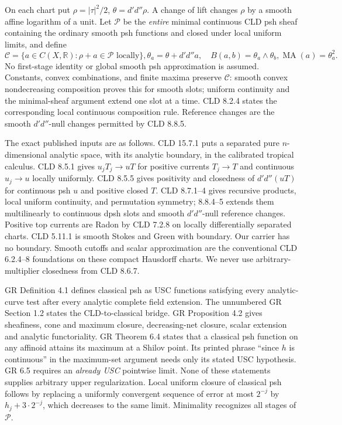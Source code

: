 \documentclass[11pt]{article}
\newcommand{\DD}{d'd''}
\newcommand{\MA}{\operatorname{MA}}
\newcommand{\C}{\mathcal C}
\newcommand{\R}{\mathbb R}
\theoremstyle{remark}\newtheorem{remark}[theorem]{Remark}
\begin{document}
On each chart put $\rho=|\tau|^2/2$, $\theta=\DD\rho$. A change
of lift changes $\rho$ by a smooth affine logarithm of a unit.
Let $\mathscr P$ be the \emph{entire} minimal continuous CLD psh
sheaf containing the ordinary smooth psh functions and closed under
local uniform limits, and define
\[
 \C=\{a\in C(X,\R):\rho+a\in\mathscr P\text{ locally}\},
 \theta_a=\theta+\DD a,\quad B(a,b)=\theta_a\wedge\theta_b,
 \MA(a)=\theta_a^2.
\]
No first-stage identity or global smooth psh approximation is assumed.
Constants, convex combinations, and finite maxima preserve $\C$:
smooth convex nondecreasing composition proves this for smooth slots;
uniform continuity and the minimal-sheaf argument extend one slot at a
time. CLD 8.2.4 states the corresponding local continuous composition
rule. Reference changes are the smooth $\DD$-null changes permitted
by CLD 8.8.5.

The exact published inputs are as follows. CLD 15.7.1 puts a separated
pure $n$-dimensional analytic space, with its analytic boundary, in the
calibrated tropical calculus. CLD 8.5.1 gives $u_jT_j\to uT$ for
positive currents $T_j\to T$ and continuous $u_j\to u$ locally
uniformly. CLD 8.5.5 gives positivity and closedness of $\DD(uT)$
for continuous psh $u$ and positive closed $T$. CLD 8.7.1--4 gives
recursive products, local uniform continuity, and permutation symmetry;
8.8.4--5 extends them multilinearly to continuous dpsh slots and
smooth $\DD$-null reference changes. Positive top currents are Radon
by CLD 7.2.8 on locally differentially separated charts. CLD 5.11.1
is smooth Stokes and Green with boundary. Our carrier has no boundary.
Smooth cutoffs and scalar approximation are the conventional
CLD 6.2.4--8 foundations on these compact Hausdorff charts.
We never use arbitrary-multiplier closedness from CLD 8.6.7.

GR Definition 4.1 defines classical psh as USC functions satisfying
every analytic-curve test after every analytic complete field extension.
The unnumbered GR Section 1.2 states the CLD-to-classical bridge.
GR Proposition 4.2 gives sheafiness, cone and maximum closure,
decreasing-net closure, scalar extension and analytic functoriality.
GR Theorem 6.4 states that a classical psh function on any affinoid
attains its maximum at a Shilov point. Its printed phrase ``since $h$
is continuous'' in the maximum-set argument needs only its stated
USC hypothesis. GR 6.5 requires an \emph{already USC} pointwise limit.
None of these statements supplies arbitrary upper regularization.
Local uniform closure of classical psh follows by replacing a uniformly
convergent sequence of error at most $2^{-j}$ by $h_j+3\cdot2^{-j}$,
which decreases to the same limit. Minimality recognizes all stages
of $\mathscr P$.
\end{document}
